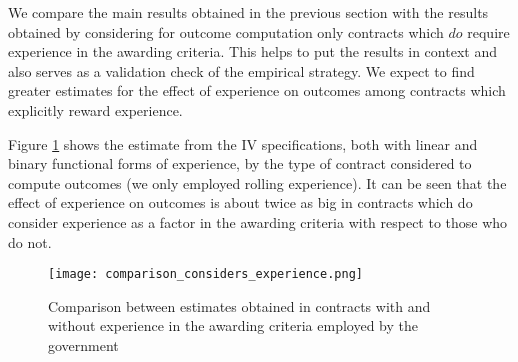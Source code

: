 We compare the main results obtained in the previous section with the results obtained by considering for outcome computation only contracts which $do$ require experience in the awarding criteria. This helps to put the results in context and also serves as a validation check of the empirical strategy. We expect to find greater estimates for the effect of experience on outcomes among contracts which explicitly reward experience.

Figure \ref{fig:comparison_considers_experience} shows the estimate from the IV specifications, both with linear and binary functional forms of experience, by the type of contract considered to compute outcomes (we only employed rolling experience). It can be seen that the effect of experience on outcomes is about twice as big in contracts which do consider experience as a factor in the awarding criteria with respect to those who do not.

\begin{figure}[H]
  \texttt{[image: comparison\_considers\_experience.png]}
  \caption{Comparison between estimates obtained in contracts with and without experience in the awarding criteria employed by the government}
  \label{fig:comparison_considers_experience}
\end{figure}




